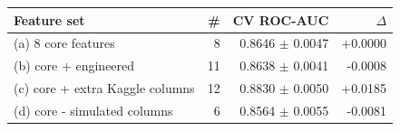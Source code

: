 \footnotesize
\setlength{\tabcolsep}{3pt}
\begin{tabular}{lrrr}
\toprule
Feature set & \# & CV ROC-AUC & $\Delta$ \\
\midrule
(a) 8 core features & 8 & 0.8646 $\pm$ 0.0047 & +0.0000 \\
(b) core + engineered & 11 & 0.8638 $\pm$ 0.0041 & -0.0008 \\
(c) core + extra Kaggle columns & 12 & 0.8830 $\pm$ 0.0050 & +0.0185 \\
(d) core - simulated columns & 6 & 0.8564 $\pm$ 0.0055 & -0.0081 \\
\bottomrule
\end{tabular}
